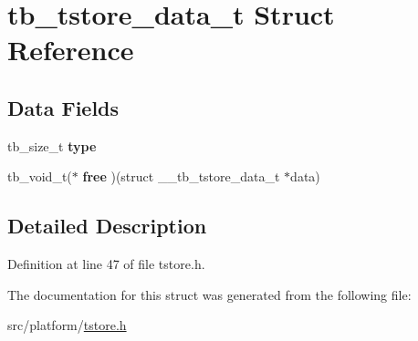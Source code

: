 \hypertarget{structtb__tstore__data__t}{\section{tb\-\_\-tstore\-\_\-data\-\_\-t Struct Reference}
\label{structtb__tstore__data__t}
}
\subsection*{Data Fields}
\begin{DoxyCompactItemize}
\item 
\hypertarget{structtb__tstore__data__t_ac6090a1b862ebc80ba6a2172c2b7736b}{tb\-\_\-size\-\_\-t {\bfseries type}}\label{structtb__tstore__data__t_ac6090a1b862ebc80ba6a2172c2b7736b}

\item 
\hypertarget{structtb__tstore__data__t_ac200cb3926b608aa78c647d1e74afd88}{tb\-\_\-void\-\_\-t($\ast$ {\bfseries free} )(struct \-\_\-\-\_\-tb\-\_\-tstore\-\_\-data\-\_\-t $\ast$data)}\label{structtb__tstore__data__t_ac200cb3926b608aa78c647d1e74afd88}

\end{DoxyCompactItemize}


\subsection{Detailed Description}


Definition at line 47 of file tstore.\-h.



The documentation for this struct was generated from the following file\-:\begin{DoxyCompactItemize}
\item 
src/platform/\hyperlink{tstore_8h}{tstore.\-h}\end{DoxyCompactItemize}
